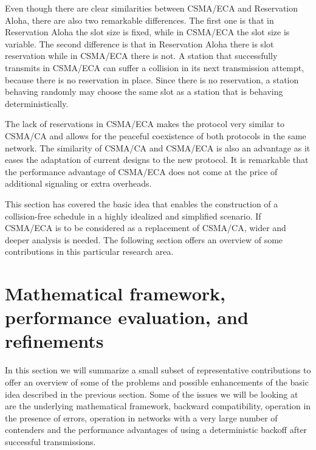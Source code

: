 \documentclass[journal]{IEEEtran}
\begin{document}

Even though there are clear similarities between CSMA/ECA and Reservation Aloha, there are also two remarkable differences.
The first one is that in Reservation Aloha the slot size is fixed, while in CSMA/ECA the slot size is variable.
The second difference is that in Reservation Aloha there is slot reservation while in CSMA/ECA there is not.
A station that successfully transmits in CSMA/ECA can suffer a collision in its next transmission attempt, because there is no reservation in place.
Since there is no reservation, a station behaving randomly may choose the same slot as a station that is behaving deterministically.

The lack of reservations in CSMA/ECA makes the protocol very similar to CSMA/CA and allows for the peaceful coexistence of both protocols in the same network.
The similarity of CSMA/CA and CSMA/ECA is also an advantage as it eases the adaptation of current designs to the new protocol.
It is remarkable that the performance advantage of CSMA/ECA does not come at the price of additional signaling or extra overheads.


This section has covered the basic idea that enables the construction of a collision-free schedule in a highly idealized and simplified scenario. If CSMA/ECA is to be considered as a replacement of CSMA/CA, wider and deeper analysis is needed. The following section offers an overview of some contributions in this particular research area.

\section{Mathematical framework, performance evaluation, and refinements}
\label{sec:survey}
In this section we will summarize a small subset of representative contributions to offer an overview of some of the problems and possible enhancements of the basic idea described in the previous section. 
Some of the issues we will be looking at are the underlying mathematical framework, backward compatibility, operation in the presence of errors, operation in networks with a very large number of contenders and the performance advantages of using a deterministic backoff after successful transmissions. 
\end{document}

